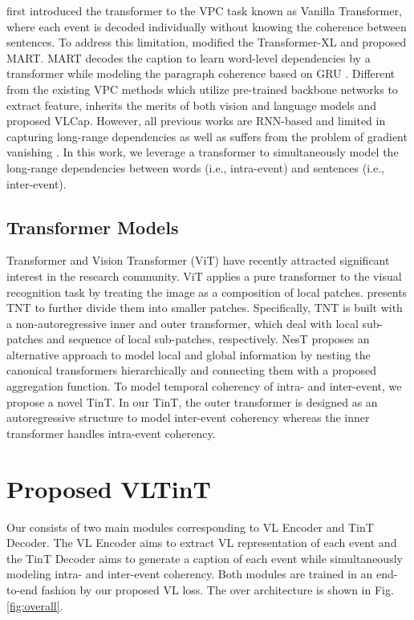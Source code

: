 \documentclass[letterpaper]{article} \usepackage{aaai23}  \usepackage{times}  \usepackage{helvet}  \usepackage{courier}  \usepackage[hyphens]{url}  \usepackage{graphicx} \urlstyle{rm} \def\UrlFont{\rm}  \usepackage{natbib}  \usepackage{caption} \frenchspacing  \setlength{\pdfpagewidth}{8.5in}  \setlength{\pdfpageheight}{11in}  \usepackage{algorithm}
\newcommand{\encoder}{VL Encoder\xspace}
\begin{document}
\cite{zhou2018end} first introduced the transformer to the VPC task known as Vanilla Transformer, where each event is decoded individually without knowing the coherence between sentences. 
To address this limitation, \cite{lei2020mart} modified the Transformer-XL \cite{dai2019transformer} and proposed MART. 
MART decodes the caption to learn word-level dependencies by a transformer while modeling the paragraph coherence based on GRU \cite{chung2014empirical}.  Different from the existing VPC methods which utilize pre-trained backbone networks to extract feature, \cite{yamazaki2022vlcap} inherits the merits of both vision and language models and proposed VLCap. However, all previous works are RNN-based and limited in capturing long-range dependencies as well as suffers from the problem of gradient vanishing \cite{pascanu2013difficulty}. 
In this work, we leverage a transformer to simultaneously model the long-range dependencies between words (i.e., intra-event) and sentences (i.e., inter-event). 

\subsection{Transformer Models}
Transformer \cite{vaswani2017attention} and Vision Transformer (ViT) \cite{dosovitskiy2020image} have recently attracted significant interest in the research community. ViT applies a pure transformer to the visual recognition task by treating the image as a composition of  local patches. 
\cite{Han2021} presents TNT to further divide them into smaller  patches. Specifically, TNT is built with a non-autoregressive inner and outer transformer, which deal with local sub-patches and sequence of local sub-patches, respectively. NesT \cite{Zhang2021} proposes an alternative approach to model local and global information by nesting the canonical transformers hierarchically and connecting them with a proposed aggregation function. 
To model temporal coherency of intra- and inter-event, we propose a novel TinT. In our TinT, the outer transformer is designed as an autoregressive structure to model inter-event coherency whereas the inner transformer handles intra-event coherency.


\section{Proposed VLTinT}

Our \model consists of two main modules corresponding to \encoder and TinT Decoder. The \encoder aims to extract VL representation of each event and the TinT Decoder aims to generate a caption of each event while simultaneously modeling intra- and inter-event coherency. Both modules are trained in an end-to-end fashion by our proposed VL loss. 
The over architecture is shown in Fig. \ref{fig:overall}. 
\end{document}
